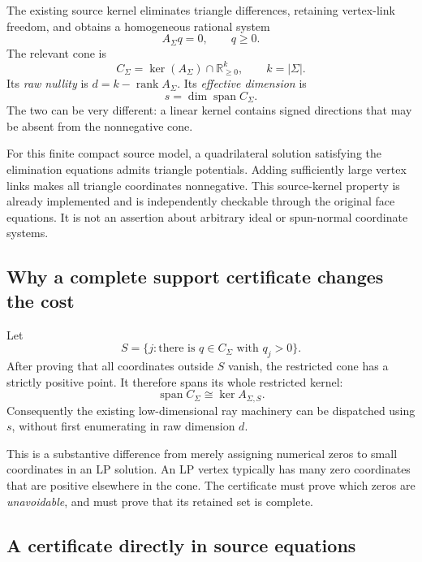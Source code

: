 \documentclass[11pt]{article}
\theoremstyle{definition}
\theoremstyle{remark}
\newcommand{\R}{\mathbb R}
\newcommand{\rank}{\operatorname{rank}}
\newcommand{\spanlin}{\operatorname{span}}
\begin{document}
The existing source kernel eliminates triangle differences, retaining
vertex-link freedom, and obtains a homogeneous rational system
\[
A_\Sigma q=0,\qquad q\geq0.
\]
The relevant cone is
\[
C_\Sigma=\ker(A_\Sigma)\cap\R_{\geq0}^{k},\qquad k=|\Sigma|.
\]
Its \emph{raw nullity} is \(d=k-\rank A_\Sigma\).
Its \emph{effective dimension} is
\[
s=\dim\spanlin C_\Sigma.
\]
The two can be very different: a linear kernel contains signed directions
that may be absent from the nonnegative cone.

For this finite compact source model, a quadrilateral solution satisfying
the elimination equations admits triangle potentials. Adding sufficiently
large vertex links makes all triangle coordinates nonnegative. This
source-kernel property is already implemented and is independently
checkable through the original face equations. It is not an assertion
about arbitrary ideal or spun-normal coordinate systems.

\subsection{Why a complete support certificate changes the cost}

Let
\[
S=\{j:\text{there is }q\in C_\Sigma\text{ with }q_j>0\}.
\]
After proving that all coordinates outside \(S\) vanish, the restricted
cone has a strictly positive point. It therefore spans its whole restricted
kernel:
\[
\spanlin C_\Sigma\cong\ker A_{\Sigma,S}.
\]
Consequently the existing low-dimensional ray machinery can be dispatched
using \(s\), without first enumerating in raw dimension \(d\).

This is a substantive difference from merely assigning numerical zeros to
small coordinates in an LP solution. An LP vertex typically has many zero
coordinates that are positive elsewhere in the cone. The certificate
must prove which zeros are \emph{unavoidable}, and must prove that its
retained set is complete.

\subsection{A certificate directly in source equations}
\end{document}
